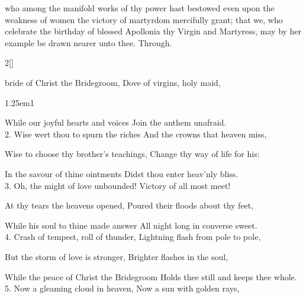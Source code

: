 \memorialCollect
{} who among the manifold works of thy power hast bestowed even upon the weakness of women the victory of martyrdom mercifully grant; that we, who celebrate the birthday of blessed Apollonia thy Virgin and Martyress, may by her example be drawn nearer unto thee. Through.


\clearpage
{}

\begin{paracol}{2}[]
\sloppy

\firstEvensong
{}

\firstEvensongHymn\label{ScholasticaEvensong}

 bride of Christ the Bridegroom, Dove of virgins, holy maid,


\begin{hangparas}{1.25em}{1}

While our joyful hearts and voices Join the anthem unafraid.\\

2. Wise wert thou to spurn the riches And the crowns that heaven miss,

Wise to choose thy brother's teachings, Change thy way of life for his:

In the savour of thine ointments Didst thou enter heav'nly bliss.\\

3. Oh, the might of love unbounded! Victory of all most meet!

At thy tears the heavens opened, Poured their floods about thy feet,

While his soul to thine made answer All night long in converse sweet.\\

4. Crash of tempest, roll of thunder, Lightning flash from pole to pole,

But the storm of love is stronger, Brighter flashes in the soul,

While the peace of Christ the Bridegroom Holds thee still and keeps thee whole.\\

5. Now a gleaming cloud in heaven, Now a sun with golden rays,


\end{hangparas}
\end{paracol}
